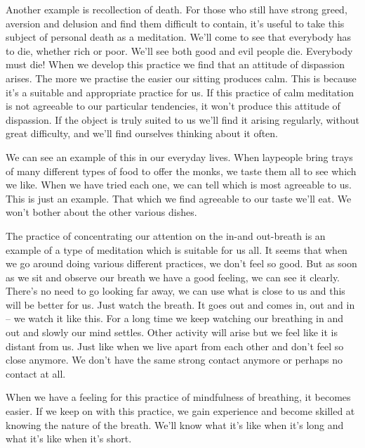 Another example is recollection of death. For those who still have strong greed, aversion and delusion and find them difficult to contain, it's useful to take this subject of personal death as a meditation. We'll come to see that everybody has to die, whether rich or poor. We'll see both good and evil people die. Everybody must die! When we develop this practice we find that an attitude of dispassion arises. The more we practise the easier our sitting produces calm. This is because it's a suitable and appropriate practice for us. If this practice of calm meditation is not agreeable to our particular tendencies, it won't produce this attitude of dispassion. If the object is truly suited to us we'll find it arising regularly, without great difficulty, and we'll find ourselves thinking about it often. 

We can see an example of this in our everyday lives. When laypeople bring trays of many different types of food to offer the monks, we taste them all to see which we like. When we have tried each one, we can tell which is most agreeable to us. This is just an example. That which we find agreeable to our taste we'll eat. We won't bother about the other various dishes. 

The practice of concentrating our attention on the in-and out-breath is an example of a type of meditation which is suitable for us all. It seems that when we go around doing various different practices, we don't feel so good. But as soon as we sit and observe our breath we have a good feeling, we can see it clearly. There's no need to go looking far away, we can use what is close to us and this will be better for us. Just watch the breath. It goes out and comes in, out and in -- we watch it like this. For a long time we keep watching our breathing in and out and slowly our mind settles. Other activity will arise but we feel like it is distant from us. Just like when we live apart from each other and don't feel so close anymore. We don't have the same strong contact anymore or perhaps no contact at all. 

When we have a feeling for this practice of mindfulness of breathing, it becomes easier. If we keep on with this practice, we gain experience and become skilled at knowing the nature of the breath. We'll know what it's like when it's long and what it's like when it's short. 

